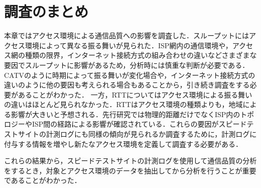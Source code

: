\FloatBarrier

\section{調査のまとめ}
本章ではアクセス環境による通信品質への影響を調査した．スループットにはアクセス環境によって異なる振る舞いが見られた．ISP網内の通信環境や，アクセス網の種類の限界，インターネット接続方式の組み合わせの違いなどさまざまな要因でスループットに影響があるため，分析時には慎重な判断が必要である．CATVのように時期によって振る舞いが変化場合や，インターネット接続方式の違いのように他の要因も考えられる場合もあることから，引き続き調査をする必要があることがわかった．
一方，RTTについてはアクセス環境による振る舞いの違いはほとんど見られなかった．RTTはアクセス環境の種類よりも，地域による影響が大きいと予想される．先行研究\cite{nasu}では物理的距離だけでなくISP内のトポロジーやISP間の経路による影響が確認されている．これらの要因がスピードテストサイトの計測ログにも同様の傾向が見られるか調査するために，計測ログに付与する情報を増やし新たなアクセス環境を定義して調査する必要がある．

これらの結果から，スピードテストサイトの計測ログを使用して通信品質の分析をするとき，対象とアクセス環境のデータを抽出してから分析を行うことが重要であることがわかった．